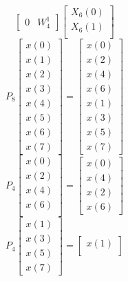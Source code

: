 \documentclass[journal,12pt,twocolumn]{IEEEtran}
\renewcommand\thesection{\arabic{section}}
\begin{document}
\begin{enumerate}[label=\arabic*.,ref=\thesection.\theenumi]
\begin{equation}
\begin{bmatrix}
			0 & W^{1}_{4}
		\end{bmatrix}
		\begin{bmatrix}
			X_{6}(0) \\ 
			X_{6}(1) \\ 
		\end{bmatrix}
	\end{equation}
	\begin{equation}
		P_{8}
		\begin{bmatrix}
			x(0) \\ 
			x(1) \\ 
			x(2) \\ 
			x(3) \\ 
			x(4) \\ 
			x(5) \\
			x(6) \\
			x(7)
		\end{bmatrix}
		= 
		\begin{bmatrix}
			x(0) \\ 
			x(2) \\ 
			x(4) \\ 
			x(6) \\
			x(1) \\ 
			x(3) \\ 
			x(5) \\
			x(7)
		\end{bmatrix}
	\end{equation}
	\begin{equation}
		P_{4}
		\begin{bmatrix}
			x(0) \\ 
			x(2) \\ 
			x(4) \\ 
			x(6) \\
		\end{bmatrix}
		= 
		\begin{bmatrix}
			x(0) \\ 
			x(4) \\ 
			x(2) \\
			x(6)
		\end{bmatrix}
	\end{equation}
	\begin{equation}
		P_{4}
		\begin{bmatrix}
			x(1) \\ 
			x(3) \\ 
			x(5) \\
			x(7)
		\end{bmatrix}
		= 
		\begin{bmatrix}
			x(1) \\ 

\end{bmatrix}
\end{equation}
\end{enumerate}
\end{document}
